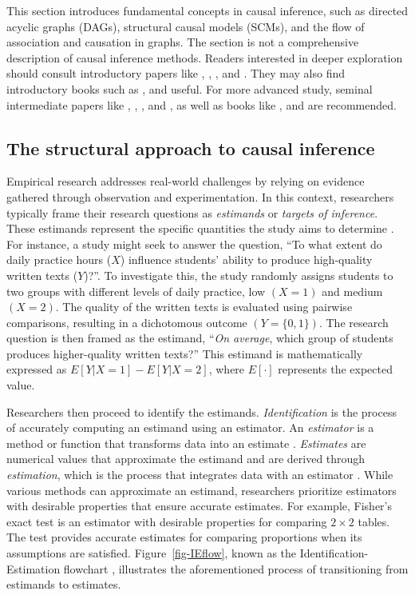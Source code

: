 \documentclass[
  authoryear,
  preprint,
  1p]{elsarticle}
\begin{document}
This section introduces fundamental concepts in causal inference, such
as directed acyclic graphs (DAGs), structural causal models (SCMs), and
the flow of association and causation in graphs. The section is not a
comprehensive description of causal inference methods. Readers
interested in deeper exploration should consult introductory papers like
\citet{Pearl_2010}, \citet{Rohrer_2018}, \citet{Pearl_2019}, and
\citet{Cinelli_et_al_2020}. They may also find introductory books such
as \citet{Pearl_et_al_2018}, \citet{Neal_2020} and
\citet{McElreath_2020} useful. For more advanced study, seminal
intermediate papers like \citet{Neyman_et_al_1923}, \citet{Rubin_1974},
\citet{Spirtes_et_al_1991}, and \citet{Sekhon_2009}, as well as books
like \citet{Pearl_2009}, \citet{Morgan_et_al_2014} and
\citet{Hernan_et_al_2020} are recommended.

\subsection{The structural approach to causal
inference}\label{sec-framework-structural}

Empirical research addresses real-world challenges by relying on
evidence gathered through observation and experimentation. In this
context, researchers typically frame their research questions as
\emph{estimands} or \emph{targets of inference}. These estimands
represent the specific quantities the study aims to determine
\citep{Everitt_et_al_2010}. For instance, a study might seek to answer
the question, ``To what extent do daily practice hours (\(X\)) influence
students' ability to produce high-quality written texts (\(Y\))?''. To
investigate this, the study randomly assigns students to two groups with
different levels of daily practice, low \((X=1)\) and medium \((X=2)\).
The quality of the written texts is evaluated using pairwise
comparisons, resulting in a dichotomous outcome \((Y=\{0,1\})\). The
research question is then framed as the estimand, ``\emph{On average},
which group of students produces higher-quality written texts?'' This
estimand is mathematically expressed as \(E[Y|X=1] - E[Y|X=2]\), where
\(E[\cdot]\) represents the expected value.

Researchers then proceed to identify the estimands.
\emph{Identification} is the process of accurately computing an estimand
using an estimator. An \emph{estimator} is a method or function that
transforms data into an estimate \citep{Neal_2020}. \emph{Estimates} are
numerical values that approximate the estimand and are derived through
\emph{estimation}, which is the process that integrates data with an
estimator \citep{Everitt_et_al_2010}. While various methods can
approximate an estimand, researchers prioritize estimators with
desirable properties that ensure accurate estimates. For example,
Fisher's exact test \citep{Fisher_1922} is an estimator with desirable
properties for comparing \(2\times2\) tables. The test provides accurate
estimates for comparing proportions when its assumptions are satisfied.
Figure~\ref{fig-IEflow}, known as the Identification-Estimation
flowchart \citep{McElreath_2020, Neal_2020}, illustrates the
aforementioned process of transitioning from estimands to estimates.
\end{document}
